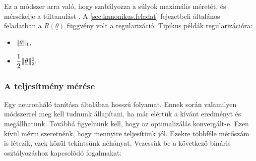 Ez a módszer arra való, hogy szabályozza a súlyok maximális méretét, és mérsékelje a túltanulást \cite{regularizacio}. A \ref{sec:kanonikus.feladat} fejezetbeli általános feladatban a $ R(\underline{\theta}) $ függvény volt a regularizáció. Tipikus példák regularizációra:

\begin{itemize}
	\item 
$ 	\lVert\underline{\theta}\rVert_1  , $
	
	\item 
	$ \dfrac{1}{2} \lVert\underline{\theta}\rVert_2^2 . $
\end{itemize}





%
%




\subsubsection{A teljesítmény mérése}

Egy neuronháló tanítása általában hosszú folyamat. Ennek során valamilyen módszerrel meg kell
tudnunk állapítani, ha már elértük a kívánt eredményt és megállhatunk. Továbbá figyelnünk kell, 
hogy az optimalizálás konvergált-e.
Ezen kívül mérni szeretnénk, hogy mennyire teljesítünk jól. 
Ezekre többféle mérőszám is létezik, ezek közül tekintsünk néhányat.
Vezessük be a következő bináris osztályozáshoz kapcsolódó fogalmakat:



